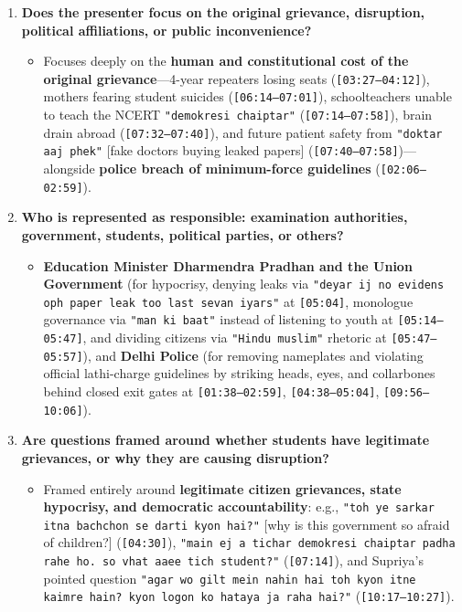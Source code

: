 \documentclass[10pt,a4paper]{article}
\begin{document}
\begin{enumerate}[leftmargin=1.6em, itemsep=4pt, topsep=4pt]
\begin{itemize}[leftmargin=1.4em, itemsep=2pt, topsep=2pt]
  \end{itemize}
  \item \textbf{Does the presenter focus on the original grievance, disruption, political affiliations, or public inconvenience?}
  \begin{itemize}[leftmargin=1.4em, itemsep=2pt, topsep=2pt]
    \item Focuses deeply on the \textbf{human and constitutional cost of the original grievance}---4-year repeaters losing seats (\texttt{[03:27--04:12]}), mothers fearing student suicides (\texttt{[06:14--07:01]}), schoolteachers unable to teach the NCERT \texttt{"demokresi chaiptar"} (\texttt{[07:14--07:58]}), brain drain abroad (\texttt{[07:32--07:40]}), and future patient safety from \texttt{"doktar aaj phek"} [fake doctors buying leaked papers] (\texttt{[07:40--07:58]})---alongside \textbf{police breach of minimum-force guidelines} (\texttt{[02:06--02:59]}).
  \end{itemize}
  \item \textbf{Who is represented as responsible: examination authorities, government, students, political parties, or others?}
  \begin{itemize}[leftmargin=1.4em, itemsep=2pt, topsep=2pt]
    \item \textbf{Education Minister Dharmendra Pradhan and the Union Government} (for hypocrisy, denying leaks via \texttt{"deyar ij no evidens oph paper leak too last sevan iyars"} at \texttt{[05:04]}, monologue governance via \texttt{"man ki baat"} instead of listening to youth at \texttt{[05:14--05:47]}, and dividing citizens via \texttt{"Hindu muslim"} rhetoric at \texttt{[05:47--05:57]}), and \textbf{Delhi Police} (for removing nameplates and violating official lathi-charge guidelines by striking heads, eyes, and collarbones behind closed exit gates at \texttt{[01:38--02:59]}, \texttt{[04:38--05:04]}, \texttt{[09:56--10:06]}).
  \end{itemize}
  \item \textbf{Are questions framed around whether students have legitimate grievances, or why they are causing disruption?}
  \begin{itemize}[leftmargin=1.4em, itemsep=2pt, topsep=2pt]
    \item Framed entirely around \textbf{legitimate citizen grievances, state hypocrisy, and democratic accountability}: e.g., \texttt{"toh ye sarkar itna bachchon se darti kyon hai?"} [why is this government so afraid of children?] (\texttt{[04:30]}), \texttt{"main ej a tichar demokresi chaiptar padha rahe ho. so vhat aaee tich student?"} (\texttt{[07:14]}), and Supriya's pointed question \texttt{"agar wo gilt mein nahin hai toh kyon itne kaimre hain? kyon logon ko hataya ja raha hai?"} (\texttt{[10:17--10:27]}).

\end{itemize}
\end{enumerate}
\end{document}
